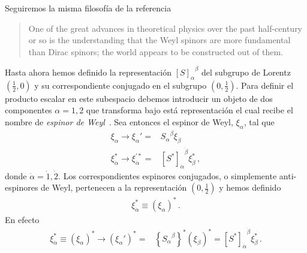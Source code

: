 Seguiremos la misma filosofía de la referencia~\cite{Zee:2016fuk}
\begin{quote}
  One of the great advances in theoretical physics over the past half-century or so is the
understanding that the Weyl spinors are more fundamental than Dirac spinors; the world
appears to be constructed out of them.
\end{quote}

\begin{frame}
  Hasta ahora hemos definido la representación ${[S]_{\alpha}}^{\beta}$ del subgrupo de Lorentz $(\frac{1}{2},0)$ y su correspondiente conjugado en el subgrupo $(0,\frac{1}{2})$. Para definir el producto escalar en este subespacio debemos introducir un objeto de dos componentes $\alpha=1,2$ que transforma bajo está representación el cual recibe el nombre de \emph{espinor de Weyl}~\cite{Dreiner:2008tw,Quevedo:2010ui}. Sea entonces el espinor de Weyl, $\xi_{\alpha}$, tal que
\begin{align*}
    \xi_{\alpha} \to \xi_{\alpha}'=&{S_{\alpha}}^{\beta}\xi_{\beta} \nonumber\\
  \xi_{\dot{\alpha}}^{*}\to \xi_{\dot{\alpha}}^{\prime *}
  =&{\left[ S^{*} \right]_{\dot{\alpha}}}^{\dot{\beta}}\xi_{\dot{\beta}}^{*}\,,
\end{align*}
donde $\dot{\alpha}=\dot{1},\dot{2}$.  Los correspondientes espinores conjugados, o simplemente anti-espinores de Weyl, pertenecen a la representación $\left( 0,\frac{1}{2}\right)$ y hemos
definido
\begin{align}
\xi_{\dot{\alpha}}^{*}\equiv  \left( \xi_{\alpha} \right)^{*}\,.
\end{align}
En efecto
\begin{align}
 \xi_{\dot{\alpha}}^{*}\equiv \left( \xi_{\alpha} \right)^{*} \to \left( \xi_{\alpha}' \right)^{*}=&
 \left\{ {S_{\alpha}}^{\beta} \right\}^{*} \left( \xi_{\beta} \right)^{*} = {\left[ S^{*} \right]_{\dot{\alpha}}}^{\dot{\beta}}\xi_{\dot{\beta}}^{*}\,.
\end{align}
  

\end{frame}
